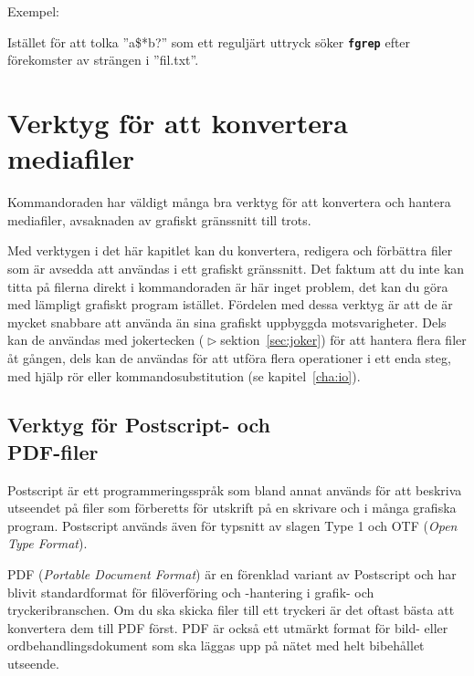 \documentclass[10pt,a4paper,final]{book}
\newcommand{\charef}[1]{kapitel~\ref{#1}}
\newcommand{\secref}[1]{$\vartriangleright$\hspace*{.1em}sektion~\ref{#1}}
\newcommand{\halfskip}{\vspace{.5\baselineskip}}
\newcommand{\halfflexskip}{\addvspace{.5\baselineskip}}
\newcommand{\xcode}[1]{\halfflexskip\fbox{\texttt{\strut #1}}\halfskip}
\newcommand{\xintro}[1]{{\Large #1\par}\vspace{.5\baselineskip}}
\newcommand{\xcommandstyle}[1]{\textbf{\texttt{#1}}}
\newcommand{\xcommand}[1]{\index{#1}\xcommandstyle{#1}}
\begin{document}
Exempel:

\xcode{fgrep \textquotesingle{}a\$*b?\textquotesingle{} fil.txt}

Istället för att tolka ''a\$*b?'' som ett reguljärt uttryck söker \xcommand{fgrep} efter förekomster av strängen i ''fil.txt''.

\chapter{Verktyg för att konvertera mediafiler}

\xintro{Kommandoraden har väldigt många bra verktyg för att konvertera och hantera mediafiler, avsaknaden av grafiskt gränssnitt till trots.}

Med verktygen i det här kapitlet kan du konvertera, redigera och förbättra filer som är avsedda att användas i ett grafiskt gränssnitt. Det faktum att du inte kan titta på filerna direkt i kommandoraden är här inget problem, det kan du göra med lämpligt grafiskt program istället. Fördelen med dessa verktyg är att de är mycket snabbare att använda än sina grafiskt uppbyggda motsvarigheter. Dels kan de användas med jokertecken (\secref{sec:joker}) för att hantera flera filer åt gången, dels kan de användas för att utföra flera operationer i ett enda steg, med hjälp rör eller kommandosubstitution (se \charef{cha:io}).

\section[Verktyg för Postscript- och PDF-filer]{Verktyg för Postscript- och\\PDF-filer}


Postscript är ett programmeringsspråk som bland annat används för att beskriva utseendet på filer som förberetts för utskrift på en skrivare och i många grafiska program. Postscript används även för typsnitt av slagen Type 1 och OTF (\textit{Open Type Format}).

PDF (\textit{Portable Document Format}) är en förenklad variant av Postscript och har blivit standardformat för filöverföring och -hantering i grafik- och tryckeribranschen. Om du ska skicka filer till ett tryckeri är det oftast bästa att konvertera dem till PDF först. PDF är också ett utmärkt format för bild- eller ordbehandlingsdokument som ska läggas upp på nätet med helt bibehållet utseende.
\end{document}
